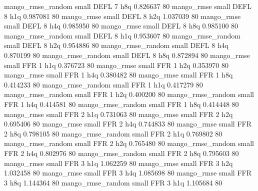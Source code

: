 mango_rmse_random      small     DEFL                 7                  h8q 0.826637 80
       mango_rmse      small     DEFL                 8                  h1q 0.987081 80
       mango_rmse      small     DEFL                 8                  h2q 1.037039 80
       mango_rmse      small     DEFL                 8                  h4q 0.985950 80
       mango_rmse      small     DEFL                 8                  h8q 0.985100 80
mango_rmse_random      small     DEFL                 8                  h1q 0.953607 80
mango_rmse_random      small     DEFL                 8                  h2q 0.954886 80
mango_rmse_random      small     DEFL                 8                  h4q 0.870199 80
mango_rmse_random      small     DEFL                 8                  h8q 0.872894 80
       mango_rmse      small      FFR                 1                  h1q 0.376723 80
       mango_rmse      small      FFR                 1                  h2q 0.353970 80
       mango_rmse      small      FFR                 1                  h4q 0.380482 80
       mango_rmse      small      FFR                 1                  h8q 0.414233 80
mango_rmse_random      small      FFR                 1                  h1q 0.417279 80
mango_rmse_random      small      FFR                 1                  h2q 0.400200 80
mango_rmse_random      small      FFR                 1                  h4q 0.414581 80
mango_rmse_random      small      FFR                 1                  h8q 0.414448 80
       mango_rmse      small      FFR                 2                  h1q 0.731063 80
       mango_rmse      small      FFR                 2                  h2q 0.695406 80
       mango_rmse      small      FFR                 2                  h4q 0.744833 80
       mango_rmse      small      FFR                 2                  h8q 0.798105 80
mango_rmse_random      small      FFR                 2                  h1q 0.769802 80
mango_rmse_random      small      FFR                 2                  h2q 0.765480 80
mango_rmse_random      small      FFR                 2                  h4q 0.802976 80
mango_rmse_random      small      FFR                 2                  h8q 0.795603 80
       mango_rmse      small      FFR                 3                  h1q 1.062259 80
       mango_rmse      small      FFR                 3                  h2q 1.032458 80
       mango_rmse      small      FFR                 3                  h4q 1.085698 80
       mango_rmse      small      FFR                 3                  h8q 1.144364 80
mango_rmse_random      small      FFR                 3                  h1q 1.105684 80
